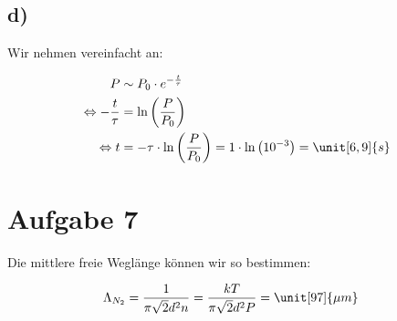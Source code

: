 \subsection*{d)}

Wir nehmen vereinfacht an:

\begin{align*}
P &\sim P_0 \cdot e^{- \frac{t}{\tau}} \\
\Leftrightarrow - \frac{t}{\tau} &= \ln\left( \frac{P}{P_0} \right) \\
\Leftrightarrow t &= - \tau \cdot \ln\left( \frac{P}{P_0} \right) = 1 \cdot \ln\left( 10^{-3} \right) = \unit[6,9]{s}
\end{align*}



\section{Aufgabe 7}

Die mittlere freie Weglänge können wir so bestimmen:

\begin{align*}
\Lambda_{N_2} &= \frac{1}{\pi \sqrt{2} d^2 n} = \frac{kT}{\pi \sqrt{2} d^2 P} = \unit[97]{\mu m}
\end{align*}









